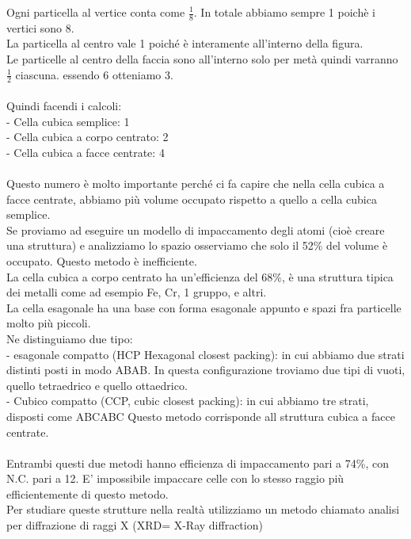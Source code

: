 Ogni particella al vertice conta come $\frac{1}{8}$. In totale abbiamo sempre 1 poichè i vertici sono 8.\\
La particella al centro vale 1 poiché è interamente all’interno della figura.\\
Le particelle al centro della faccia sono all’interno solo per metà quindi varranno $\frac{1}{2}$ ciascuna. essendo 6 otteniamo 3.\\\\
Quindi facendi i calcoli:\\
\tab- Cella cubica semplice: 1\\
\tab- Cella cubica a corpo centrato: 2\\
\tab- Cella cubica a facce centrate: 4\\\\
Questo numero è molto importante perché ci fa capire che nella cella cubica a facce centrate, abbiamo più volume occupato rispetto a quello a cella cubica semplice. \\
Se proviamo ad eseguire un modello di impaccamento degli atomi (cioè creare una struttura) e analizziamo lo spazio osserviamo che solo il 52\% del volume è occupato. Questo metodo è inefficiente.\\ 
La cella cubica a corpo centrato ha un'efficienza del 68\%, è una struttura tipica dei metalli come ad esempio Fe, Cr, 1 gruppo, e altri.\\
La cella esagonale ha una base con forma esagonale appunto e spazi fra particelle molto più piccoli. \\
Ne distinguiamo due tipo:\\
\tab- esagonale compatto (HCP Hexagonal closest packing): in cui abbiamo due strati distinti posti in modo ABAB. In questa configurazione troviamo due tipi di vuoti, quello tetraedrico e quello ottaedrico.\\
\tab- Cubico compatto (CCP, cubic closest packing): in cui abbiamo tre strati, disposti come ABCABC Questo metodo corrisponde all struttura cubica a facce centrate.\\\\
Entrambi questi due metodi hanno efficienza di impaccamento pari a 74\%, con N.C. pari a 12. E’ impossibile impaccare celle con lo stesso raggio più efficientemente di questo metodo. \\
Per studiare queste strutture nella realtà utilizziamo un metodo chiamato analisi per diffrazione di raggi X (XRD= X-Ray diffraction)
